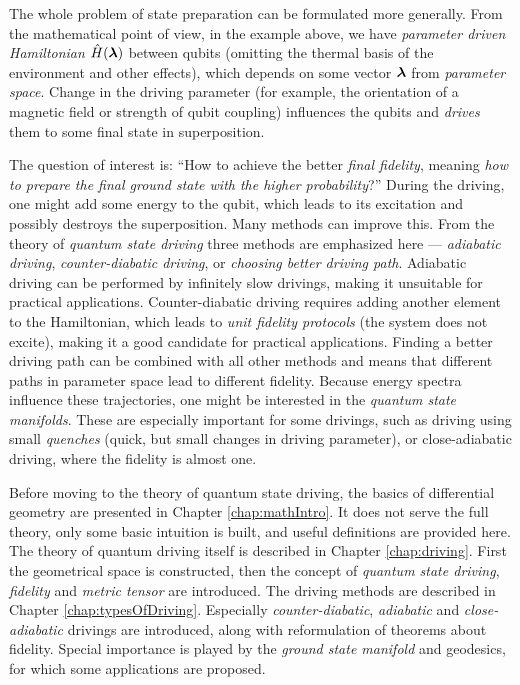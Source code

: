 The whole problem of state preparation can be formulated more generally. From the mathematical point of view, in the example above, we have \emph{parameter driven Hamiltonian} $\hat{H}({\bm\lambda})$ between qubits (omitting the thermal basis of the environment and other effects), which depends on some vector ${\bm\lambda}$ from \emph{parameter space}. Change in the driving parameter (for example, the orientation of a magnetic field or strength of qubit coupling) influences the qubits and \emph{drives} them to some final state in superposition.

The question of interest is: “How to achieve the better \emph{final fidelity}, meaning \emph{how to prepare the final ground state with the higher probability}?” During the driving, one might add some energy to the qubit, which leads to its excitation and possibly destroys the superposition. Many methods can improve this. From the theory of \emph{quantum state driving} three methods are emphasized here — \emph{adiabatic driving}, \emph{counter-diabatic driving}, or \emph{choosing better driving path}. Adiabatic driving can be performed by infinitely slow drivings, making it unsuitable for practical applications. Counter-diabatic driving requires adding another element to the Hamiltonian, which leads to \emph{unit fidelity protocols} (the system does not excite), making it a good candidate for practical applications. Finding a better driving path can be combined with all other methods and means that different paths in parameter space lead to different fidelity. Because energy spectra influence these trajectories, one might be interested in the \emph{quantum state manifolds}. These are especially important for some drivings, such as driving using small \emph{quenches} (quick, but small changes in driving parameter), or close-adiabatic driving, where the fidelity is almost one.

Before moving to the theory of quantum state driving, the basics of differential geometry are presented in Chapter \ref{chap:mathIntro}. It does not serve the full theory, only some basic intuition is built, and useful definitions are provided here. The theory of quantum driving itself is described in Chapter \ref{chap:driving}. First the geometrical space is constructed, then the concept of \emph{quantum state driving}, \emph{fidelity} and \emph{metric tensor} are introduced.
The driving methods are described in Chapter \ref{chap:typesOfDriving}. Especially \emph{counter-diabatic}, \emph{adiabatic} and \emph{close-adiabatic} drivings are introduced, along with reformulation of theorems about fidelity. Special importance is played by the \emph{ground state manifold} and geodesics, for which some applications are proposed.

